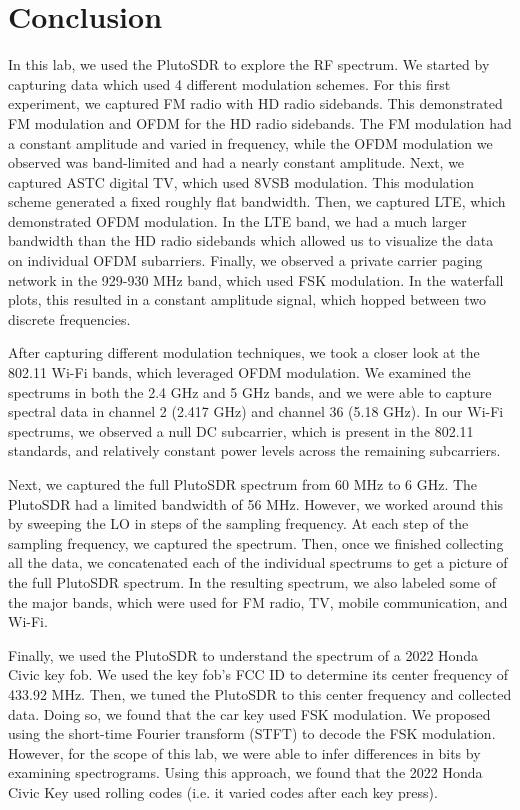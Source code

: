 \documentclass{article}
\begin{document}
\section{Conclusion}

In this lab, we used the PlutoSDR to explore the RF spectrum. We started by capturing data which used 4 different modulation schemes. For this first experiment, we captured FM radio with HD radio sidebands. This demonstrated FM modulation and OFDM for the HD radio sidebands. The FM modulation had a constant amplitude and varied in frequency, while the OFDM modulation we observed was band-limited and had a nearly constant amplitude. Next, we captured ASTC digital TV, which used 8VSB modulation. This modulation scheme generated a fixed roughly flat bandwidth. Then, we captured LTE, which demonstrated OFDM modulation. In the LTE band, we had a much larger bandwidth than the HD radio sidebands which allowed us to visualize the data on individual OFDM subarriers. Finally, we observed a private carrier paging network in the 929-930 MHz band, which used FSK modulation. In the waterfall plots, this resulted in a constant amplitude signal, which hopped between two discrete frequencies.

After capturing different modulation techniques, we took a closer look at the 802.11 Wi-Fi bands, which leveraged OFDM modulation. We examined the spectrums in both the 2.4 GHz and 5 GHz bands, and we were able to capture spectral data in channel 2 (2.417 GHz) and channel 36 (5.18 GHz). In our Wi-Fi spectrums, we observed a null DC subcarrier, which is present in the 802.11 standards, and relatively constant power levels across the remaining subcarriers.

Next, we captured the full PlutoSDR spectrum from 60 MHz to 6 GHz. The PlutoSDR had a limited bandwidth of 56 MHz. However, we worked around this by sweeping the LO in steps of the sampling frequency. At each step of the sampling frequency, we captured the spectrum. Then, once we finished collecting all the data, we concatenated each of the individual spectrums to get a picture of the full PlutoSDR spectrum. In the resulting spectrum, we also labeled some of the major bands, which were used for FM radio, TV, mobile communication, and Wi-Fi.

Finally, we used the PlutoSDR to understand the spectrum of a 2022 Honda Civic key fob. We used the key fob's FCC ID to determine its center frequency of 433.92 MHz. Then, we tuned the PlutoSDR to this center frequency and collected data. Doing so, we found that the car key used FSK modulation. We proposed using the short-time Fourier transform (STFT) to decode the FSK modulation. However, for the scope of this lab, we were able to infer differences in bits by examining spectrograms. Using this approach, we found that the 2022 Honda Civic Key used rolling codes (i.e. it varied codes after each key press).
\end{document}
